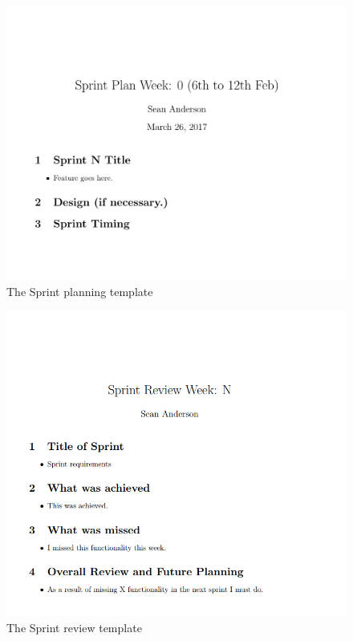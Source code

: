 \begin{figure}[H]
\includegraphics[width=\textwidth,height=\textheight,keepaspectratio]{images/sp}
\caption{The Sprint planning template}
\end{figure}
\begin{figure}[H]
\includegraphics[width=\textwidth,height=\textheight,keepaspectratio]{images/sr}
\caption{The Sprint review template}
\end{figure}

